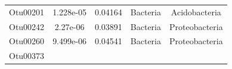 \documentclass[]{article}
\begin{document}
\begin{longtable}[]{@{}ccccc@{}}
\begin{minipage}[t]{0.13\columnwidth}
Otu00201\strut
\end{minipage} & \begin{minipage}[t]{0.14\columnwidth}\centering\strut
1.228e-05\strut
\end{minipage} & \begin{minipage}[t]{0.13\columnwidth}\centering\strut
0.04164\strut
\end{minipage} & \begin{minipage}[t]{0.13\columnwidth}\centering\strut
Bacteria\strut
\end{minipage} & \begin{minipage}[t]{0.27\columnwidth}\centering\strut
Acidobacteria\strut
\end{minipage}\tabularnewline
\begin{minipage}[t]{0.13\columnwidth}\centering\strut
Otu00242\strut
\end{minipage} & \begin{minipage}[t]{0.14\columnwidth}\centering\strut
2.27e-06\strut
\end{minipage} & \begin{minipage}[t]{0.13\columnwidth}\centering\strut
0.03891\strut
\end{minipage} & \begin{minipage}[t]{0.13\columnwidth}\centering\strut
Bacteria\strut
\end{minipage} & \begin{minipage}[t]{0.27\columnwidth}\centering\strut
Proteobacteria\strut
\end{minipage}\tabularnewline
\begin{minipage}[t]{0.13\columnwidth}\centering\strut
Otu00260\strut
\end{minipage} & \begin{minipage}[t]{0.14\columnwidth}\centering\strut
9.499e-06\strut
\end{minipage} & \begin{minipage}[t]{0.13\columnwidth}\centering\strut
0.04541\strut
\end{minipage} & \begin{minipage}[t]{0.13\columnwidth}\centering\strut
Bacteria\strut
\end{minipage} & \begin{minipage}[t]{0.27\columnwidth}\centering\strut
Proteobacteria\strut
\end{minipage}\tabularnewline
\begin{minipage}[t]{0.13\columnwidth}\centering\strut
Otu00373\strut
\end{minipage} & \begin{minipage}[t]{0.14\columnwidth}\centering\strut

\end{minipage}
\end{longtable}
\end{document}
